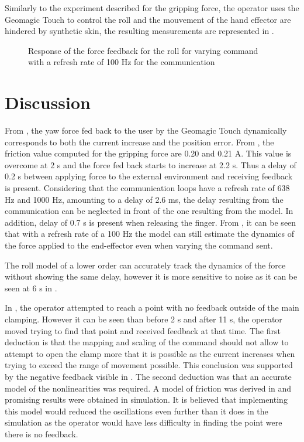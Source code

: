 Similarly to the experiment described for the gripping force, the operator uses the Geomagic Touch to control the roll and the mouvement of the hand effector are hindered by synthetic skin, the resulting measurements are represented in .
\begin{figure}[H]
  
  \caption{Response of the force feedback for the roll for varying command with a refresh rate of 100 Hz for the communication}
  \label{fig:fbkm_roll_100}
\end{figure}




\section{Discussion}


From , the yaw force fed back to the user by the Geomagic Touch dynamically corresponds to both the current increase and the position error. From , the friction value computed for the gripping force are 0.20 and 0.21 A. This value is overcome at 2 s and the force fed back starts to increase at 2.2 s. Thus a delay of 0.2 s between applying force to the external environment and receiving feedback is present. Considering that the communication loops have a refresh rate of 638 Hz and 1000 Hz, amounting to a delay of 2.6 ms, the delay resulting from the communication can be neglected in front of the one resulting from the model. In addition, delay of 0.7 s is present when releasing the finger.
From , it can be seen that with a refresh rate of a 100 Hz the model can still estimate the dynamics of the force applied to the end-effector even when varying the command sent.

The roll model of a lower order can accurately track the dynamics of the force without showing the same delay, however it is more sensitive to noise as it can be seen at 6 s in .


In , the operator attempted to reach a point with no feedback outside of the main clamping. However it can be seen than before 2 s and after 11 s, the operator moved trying to find that point and received feedback at that time. The first deduction is that the mapping and scaling of the command should not allow to attempt to open the clamp more that it is possible as the current increases when trying to exceed the range of movement possible. This conclusion was supported by the negative feedback visible in . The second deduction was that an accurate model of the nonlinearities was required. A model of friction was derived in  and promising results were obtained in simulation. It is believed that implementing this model would reduced the oscillations even further than it does in the simulation as the operator would have less difficulty in finding the point were there is no feedback.

